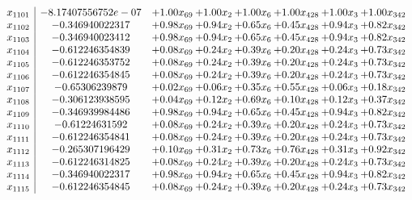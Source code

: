 \documentclass[8pt]{article}
\begin{document}
\[\begin{array}{c| c c@{\hskip 2pt} c@{\hskip 2pt} c@{\hskip 2pt} c@{\hskip 2pt} c@{\hskip 2pt} c@{\hskip 2pt} }
 x_{1101}   &  -8.17407556752e-07 & +  1.00 x_{69} & +  1.00 x_{2} & +  1.00 x_{6} & +  1.00 x_{428} & +  1.00 x_{3} & +  1.00 x_{342}\\
 x_{1102}   &  -0.346940022317 & +  0.98 x_{69} & +  0.94 x_{2} & +  0.65 x_{6} & +  0.45 x_{428} & +  0.94 x_{3} & +  0.82 x_{342}\\
 x_{1103}   &  -0.346940023412 & +  0.98 x_{69} & +  0.94 x_{2} & +  0.65 x_{6} & +  0.45 x_{428} & +  0.94 x_{3} & +  0.82 x_{342}\\
 x_{1104}   &  -0.612246354839 & +  0.08 x_{69} & +  0.24 x_{2} & +  0.39 x_{6} & +  0.20 x_{428} & +  0.24 x_{3} & +  0.73 x_{342}\\
 x_{1105}   &  -0.612246353752 & +  0.08 x_{69} & +  0.24 x_{2} & +  0.39 x_{6} & +  0.20 x_{428} & +  0.24 x_{3} & +  0.73 x_{342}\\
 x_{1106}   &  -0.612246354845 & +  0.08 x_{69} & +  0.24 x_{2} & +  0.39 x_{6} & +  0.20 x_{428} & +  0.24 x_{3} & +  0.73 x_{342}\\
 x_{1107}   &  -0.65306239879 & +  0.02 x_{69} & +  0.06 x_{2} & +  0.35 x_{6} & +  0.55 x_{428} & +  0.06 x_{3} & +  0.18 x_{342}\\
 x_{1108}   &  -0.306123938595 & +  0.04 x_{69} & +  0.12 x_{2} & +  0.69 x_{6} & +  0.10 x_{428} & +  0.12 x_{3} & +  0.37 x_{342}\\
 x_{1109}   &  -0.346939984486 & +  0.98 x_{69} & +  0.94 x_{2} & +  0.65 x_{6} & +  0.45 x_{428} & +  0.94 x_{3} & +  0.82 x_{342}\\
 x_{1110}   &  -0.61224631592 & +  0.08 x_{69} & +  0.24 x_{2} & +  0.39 x_{6} & +  0.20 x_{428} & +  0.24 x_{3} & +  0.73 x_{342}\\
 x_{1111}   &  -0.612246354841 & +  0.08 x_{69} & +  0.24 x_{2} & +  0.39 x_{6} & +  0.20 x_{428} & +  0.24 x_{3} & +  0.73 x_{342}\\
 x_{1112}   &  -0.265307196429 & +  0.10 x_{69} & +  0.31 x_{2} & +  0.73 x_{6} & +  0.76 x_{428} & +  0.31 x_{3} & +  0.92 x_{342}\\
 x_{1113}   &  -0.612246314825 & +  0.08 x_{69} & +  0.24 x_{2} & +  0.39 x_{6} & +  0.20 x_{428} & +  0.24 x_{3} & +  0.73 x_{342}\\
 x_{1114}   &  -0.346940022317 & +  0.98 x_{69} & +  0.94 x_{2} & +  0.65 x_{6} & +  0.45 x_{428} & +  0.94 x_{3} & +  0.82 x_{342}\\
 x_{1115}   &  -0.612246354845 & +  0.08 x_{69} & +  0.24 x_{2} & +  0.39 x_{6} & +  0.20 x_{428} & +  0.24 x_{3} & +  0.73 x_{342}\\

\end{array}\]
\end{document}
